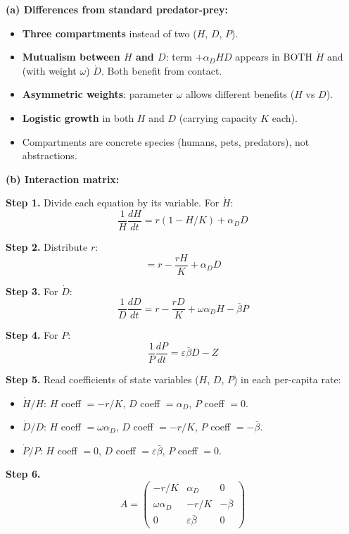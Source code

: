 \documentclass[10pt]{article}
\begin{document}
\begin{solution}
\textbf{(a) Differences from standard predator-prey:}

\begin{itemize}
\item \textbf{Three compartments} instead of two ($H$, $D$, $P$).
\item \textbf{Mutualism between $H$ and $D$}: term $+\alpha_D HD$ appears in BOTH $\dot H$ and (with weight $\omega$) $\dot D$. Both benefit from contact.
\item \textbf{Asymmetric weights}: parameter $\omega$ allows different benefits ($H$ vs $D$).
\item \textbf{Logistic growth} in both $H$ and $D$ (carrying capacity $K$ each).
\item Compartments are concrete species (humans, pets, predators), not abstractions.
\end{itemize}

\medskip\textbf{(b) Interaction matrix:}

\textbf{Step 1.} Divide each equation by its variable. For $\dot H$:
\[
\frac{1}{H}\frac{dH}{dt} = r(1-H/K) + \alpha_D D
\]

\textbf{Step 2.} Distribute $r$:
\[
= r - \frac{r H}{K} + \alpha_D D
\]

\textbf{Step 3.} For $\dot D$:
\[
\frac{1}{D}\frac{dD}{dt} = r - \frac{rD}{K} + \omega\alpha_D H - \bar\beta P
\]

\textbf{Step 4.} For $\dot P$:
\[
\frac{1}{P}\frac{dP}{dt} = \varepsilon\bar\beta D - Z
\]

\textbf{Step 5.} Read coefficients of state variables ($H$, $D$, $P$) in each per-capita rate:
\begin{itemize}
\item $\dot H/H$: $H$ coeff $= -r/K$, $D$ coeff $= \alpha_D$, $P$ coeff $= 0$.
\item $\dot D/D$: $H$ coeff $= \omega\alpha_D$, $D$ coeff $= -r/K$, $P$ coeff $= -\bar\beta$.
\item $\dot P/P$: $H$ coeff $= 0$, $D$ coeff $= \varepsilon\bar\beta$, $P$ coeff $= 0$.
\end{itemize}

\textbf{Step 6.}
\[
\boxed{A = \begin{pmatrix} -r/K & \alpha_D & 0 \\ \omega\alpha_D & -r/K & -\bar\beta \\ 0 & \varepsilon\bar\beta & 0 \end{pmatrix}}
\]


\end{solution}
\end{document}

